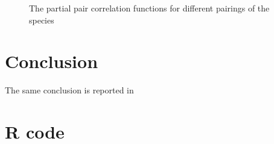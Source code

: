 \documentclass[12pt,a4paper,oneside,article]{memoir}
\begin{document}
\begin{figure}[htbp]
  \begin{adjustwidth}{-2in}{-2in}
	  \centering
  \end{adjustwidth}
  \caption{The partial pair correlation functions for different pairings of the species}
  \label{fig:ppcf}
\end{figure}

\section{Conclusion}

The same conclusion is reported in \cite{perry}


\printbibliography
\clearpage
\appendix
\section*{R code}


\end{document}
